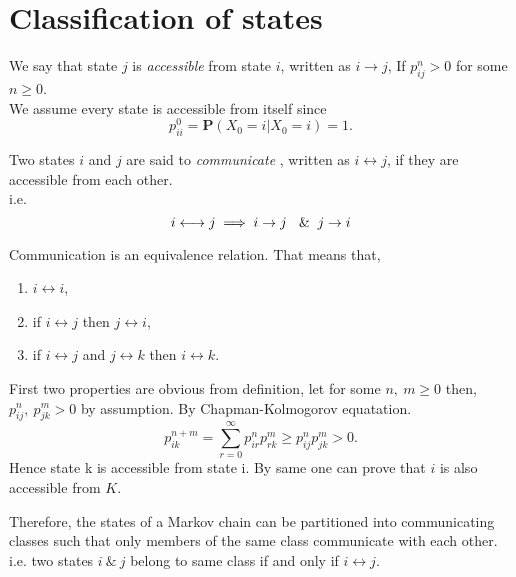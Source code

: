 \section{Classification of states}
\begin{definition}[]
    We say that state $j$ is \textit{accessible} from state $i$, written as $ i \to j $, If  $ p^{n}_{ij}>0 $ for some $ n\ge 0 $.\\ 
    We assume every state is accessible from itself since
    \[
        p^{0}_{ii} = \mathbf{P}(X_{0}=i|X_{0}=i) = 1.
    \]
\end{definition}

\begin{definition}[]
    Two states $i$ and $j$ are said to \textit{communicate} , written as $ i \longleftrightarrow j $, if they are accessible from each other.\\ 
    i.e.
    \[
        i\longleftrightarrow j \implies i \to j \ \And j\to i
    \]
\end{definition}

Communication is an equivalence relation. That means that,
\begin{enumerate}
    \item $ i\longleftrightarrow i $,
    \item if $ i\longleftrightarrow j $ then  $ j\longleftrightarrow i$,
    \item if  $ i\longleftrightarrow j $ and  $ j\longleftrightarrow k $ then  $ i\longleftrightarrow k $.
\end{enumerate}

First two properties are obvious from definition, let for some $n,\ m \ge 0$ then, $ p^{n}_{ij},\ p^{m}_{jk}>0 $ by assumption.
By Chapman-Kolmogorov equatation.
\[
    p^{n+m}_{ik} = \sum_{r=0}^{\infty} p^{n}_{ir}p^{m}_{rk} \ge p^{n}_{ij}p^{m}_{jk}>0.
\]
Hence state k is accessible from state i. By same one can prove that $i$ is also accessible from $K$.

Therefore, the states of a Markov chain can be partitioned into communicating classes such that 
only members of the same class communicate with each other. 
i.e. two states $ i \ \&\ j $ belong to same class if and only if $ i\longleftrightarrow j $.

